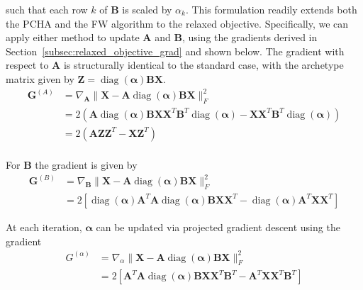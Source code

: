 \documentclass{article}
\begin{document}
such that each row $k$ of $\mathbf{B}$ is scaled by $\alpha_k$. This formulation readily extends both the PCHA and the FW algorithm to the relaxed objective. Specifically, we can apply either method to update $\mathbf{A}$ and $\mathbf{B}$, using the gradients derived in Section~\ref{subsec:relaxed_objective_grad} and shown below. The gradient with respect to $\mathbf{A}$ is structurally identical to the standard case, with the archetype matrix given by $\mathbf{Z} = \operatorname{diag}(\boldsymbol{\alpha}) \mathbf{B} \mathbf{X}$.
\begin{equation}
    \label{eq:relaxed_objective_grad_A_}
    \begin{aligned}
        \mathbf{G}^{(A)} &= \nabla_{\mathbf{A}} \| {\mathbf{X}} - {\mathbf{A}} \operatorname{diag}(\boldsymbol{\alpha}) \mathbf{B} \mathbf{X} \|_F^2 \\
        &= 2 \left( \mathbf{A} \operatorname{diag}(\boldsymbol{\alpha}) \mathbf{B} \mathbf{X} \mathbf{X}^T \mathbf{B}^T \operatorname{diag}(\boldsymbol{\alpha}) - \mathbf{X} \mathbf{X}^T \mathbf{B}^T \operatorname{diag}(\boldsymbol{\alpha}) \right) \\
        &= 2 \left( \mathbf{A} \mathbf{Z} \mathbf{Z}^T - \mathbf{X}\mathbf{Z}^T \right) \\
    \end{aligned}
\end{equation}

For $\mathbf{B}$ the gradient is given by
\begin{equation}
    \label{eq:relaxed_objective_grad_B_}
    \begin{aligned}
        \mathbf{G}^{(B)} &= \nabla_{\mathbf{B}} \| {\mathbf{X}} - {\mathbf{A}} \operatorname{diag}(\boldsymbol{\alpha}) \mathbf{B} \mathbf{X}\|_F^2 \\
        &= 2
        \left[
            \operatorname{diag}(\boldsymbol{\alpha}) \mathbf{{A}}^T \mathbf{{A}} \operatorname{diag}(\boldsymbol{\alpha}) \mathbf{B} \mathbf{X} \mathbf{X}^T
            - \operatorname{diag}(\boldsymbol{\alpha}) \mathbf{{A}}^T \mathbf{{X}} \mathbf{X}^T
        \right]
    \end{aligned}
\end{equation}

At each iteration, $\boldsymbol{\alpha}$ can be updated via projected gradient descent using the gradient
\begin{equation}
    \label{eq:relaxed_objective_grad_alpha_}
    \begin{aligned}
        G^{(\alpha)} &= \nabla_{\alpha} \| {\mathbf{X}} - {\mathbf{A}} \operatorname{diag}(\boldsymbol{\alpha}) \mathbf{B} \mathbf{X}\|_F^2 \\
        & = 2
        \left[
            \mathbf{{A}}^T \mathbf{{A}} \operatorname{diag}(\boldsymbol{\alpha}) \mathbf{B} \mathbf{X} \mathbf{X}^T \mathbf{B}^T
            - \mathbf{{A}}^T \mathbf{{X}} \mathbf{X}^T \mathbf{B}^T
        \right]
    \end{aligned}
\end{equation}
\end{document}
